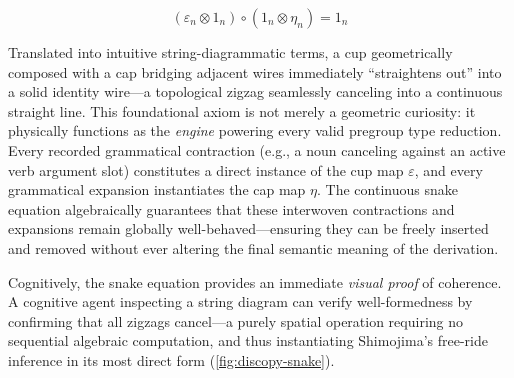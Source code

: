 \documentclass[
]{article}
\begin{document}
\begin{equation}
(\varepsilon_n \otimes 1_n) \circ (1_n \otimes \eta_n) = 1_n
\label{eq:eq-4-3}
\end{equation}

Translated into intuitive string-diagrammatic terms, a cup geometrically
composed with a cap bridging adjacent wires immediately ``straightens
out'' into a solid identity wire---a topological zigzag seamlessly
canceling into a continuous straight line. This foundational axiom is
not merely a geometric curiosity: it physically functions as the
\emph{engine} powering every valid pregroup type reduction. Every
recorded grammatical contraction (e.g., a noun canceling against an
active verb argument slot) constitutes a direct instance of the cup map
\(\varepsilon{}\), and every grammatical expansion instantiates the cap
map \(\eta{}\). The continuous snake equation algebraically guarantees
that these interwoven contractions and expansions remain globally
well-behaved---ensuring they can be freely inserted and removed without
ever altering the final semantic meaning of the derivation.

Cognitively, the snake equation provides an immediate \emph{visual
proof} of coherence. A cognitive agent inspecting a string diagram can
verify well-formedness by confirming that all zigzags cancel---a purely
spatial operation requiring no sequential algebraic computation, and
thus instantiating Shimojima's \citeyearpar{shimojima1996reasoning}
free-ride inference in its most direct form
(\autoref{fig:discopy-snake}).
\end{document}
